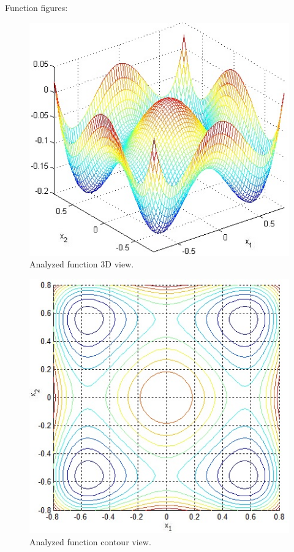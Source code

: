 \documentclass[12pt]{article}
\begin{document}
Function figures:
	\begin{figure}[H]
		\includegraphics[width=12cm]{four_3d.jpg}
		\caption{Analyzed function 3D view.}
	\end{figure}
	\begin{figure}[H]
			\includegraphics[width=12cm]{four_cont.jpg}
		\caption{Analyzed function contour view.}
	\end{figure}	
\end{document}

